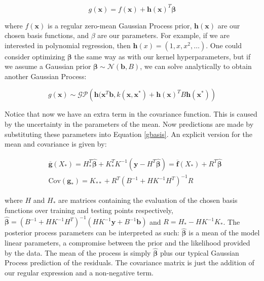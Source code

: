 \documentclass[10pt,a4paper,twoside]{book}
\begin{document}
\begin{equation}
\label{gbasis}
g(\boldsymbol{x}) = f(\boldsymbol{x}) + \boldsymbol{h}(\boldsymbol{x})^T\boldsymbol{\beta}
\end{equation}

where $f(\boldsymbol{x})$ is a regular zero-mean Gaussian Process prior, $\boldsymbol{h}(\boldsymbol{x})$ are our chosen basis functions, and $\beta$ are our parameters. For example, if we are interested in polynomial regression, then $\boldsymbol{h}(x) = (1, x, x^2, \dots)$. One could consider optimizing $\boldsymbol{\beta}$ the same way as with our kernel hyperparameters, but if we assume a Gaussian prior $\boldsymbol{\beta} \sim \mathcal{N}(\boldsymbol{b}, B)$, we can solve analytically to obtain another Gaussian Process:

\begin{equation}
g(\boldsymbol{x}) \sim \mathcal{G}\mathcal{P}\left(\boldsymbol{h}(\boldsymbol{x}^T\boldsymbol{b}, k(\boldsymbol{x}, \boldsymbol{x}^*) + \boldsymbol{h}(\boldsymbol{x})^T B \boldsymbol{h}(\boldsymbol{x}^*)\right)
\end{equation} 

Notice that now we have an extra term in the covariance function. This is caused by the uncertainty in the parameters of the mean. Now predictions are made by substituting these parameters into Equation \ref{gbasis}. An explicit version for the mean and covariance is given by:

\begin{align}
&\overline{\boldsymbol{g}}(X_*) = H^T_* \hat{\boldsymbol{\beta}} + K_*^T K^{-1}(\boldsymbol{y} - H^T\hat{\boldsymbol{\beta}}) = \overline{\boldsymbol{f}}(X_*) + R^T\hat{\boldsymbol{\beta}}\\
&\mathrm{Cov}(\boldsymbol{g_*}) = K_{**} + R^T(B^{-1} + HK^{-1}H^T)^{-1}R
\end{align}

where $H$ and $H_*$ are matrices containing the evaluation of the chosen basis functions over training and testing points respectively, $\hat{\boldsymbol{\beta}} = (B^{-1} + H K^{-1} H^T)^{-1}(H K^{-1}\boldsymbol{y} + B^{-1}\boldsymbol{b})$ and $R = H_* - HK^{-1}K_{*}$. The posterior process parameters can be interpreted as such: $\hat{\boldsymbol{\beta}}$ is a mean of the model linear parameters, a compromise between the prior and the likelihood provided by the data. The mean of the process is simply $\hat{\boldsymbol{\beta}}$ plus our typical Gaussian Process prediction of the residuals. The covariance matrix is just the addition of our regular expression and a non-negative term.\\
\end{document}
